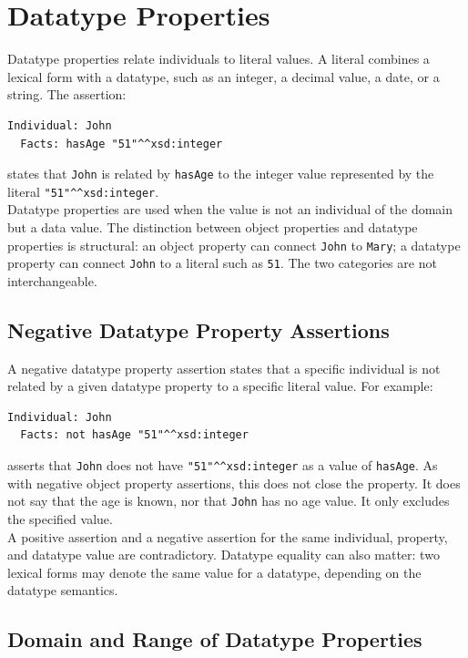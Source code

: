\documentclass{scrbook}
\begin{document}
	\section{Datatype Properties}
	
	Datatype properties relate individuals to literal values. A literal combines a lexical form with a datatype, such as an integer, a decimal value, a date, or a string. The assertion:
	\begin{lstlisting}
Individual: John
  Facts: hasAge "51"^^xsd:integer
	\end{lstlisting}
	states that \texttt{John} is related by \texttt{hasAge} to the integer value represented by the literal \texttt{"51"\textasciicircum{}\textasciicircum{}xsd:integer}.\\
	
	Datatype properties are used when the value is not an individual of the domain but a data value. The distinction between object properties and datatype properties is structural: an object property can connect \texttt{John} to \texttt{Mary}; a datatype property can connect \texttt{John} to a literal such as \texttt{51}. The two categories are not interchangeable.
	
	\subsection{Negative Datatype Property Assertions}
	
	A negative datatype property assertion states that a specific individual is not related by a given datatype property to a specific literal value. For example:
	\begin{lstlisting}
Individual: John
  Facts: not hasAge "51"^^xsd:integer
	\end{lstlisting}
	asserts that \texttt{John} does not have \texttt{"51"\textasciicircum{}\textasciicircum{}xsd:integer} as a value of \texttt{hasAge}. As with negative object property assertions, this does not close the property. It does not say that the age is known, nor that \texttt{John} has no age value. It only excludes the specified value.\\
	
	A positive assertion and a negative assertion for the same individual, property, and datatype value are contradictory. Datatype equality can also matter: two lexical forms may denote the same value for a datatype, depending on the datatype semantics.
	
	\subsection{Domain and Range of Datatype Properties}
	
\end{document}
